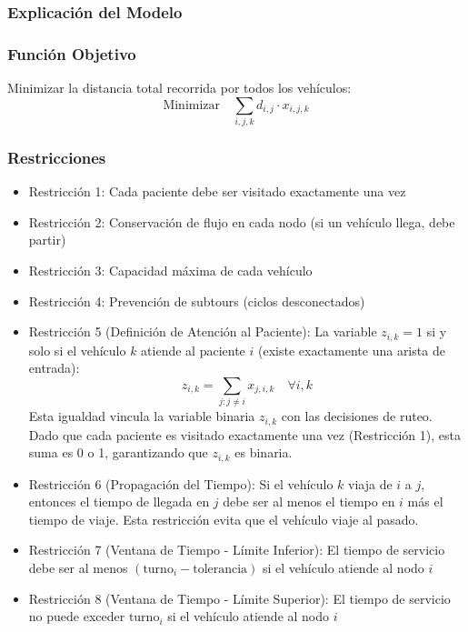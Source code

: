 \documentclass[12pt]{article}
\begin{document}
\subsubsection{Explicación del Modelo}

\subsubsection*{Función Objetivo}

Minimizar la distancia total recorrida por todos los vehículos:
\[
\text{Minimizar} \quad \sum_{i,j,k} d_{i,j} \cdot x_{i,j,k}
\]

\subsubsection*{Restricciones}

\begin{itemize}
    \item Restricción 1: Cada paciente debe ser visitado exactamente una vez
    
    \item Restricción 2: Conservación de flujo en cada nodo (si un vehículo llega, debe partir)
    
    \item Restricción 3: Capacidad máxima de cada vehículo
    
    \item Restricción 4: Prevención de subtours (ciclos desconectados)
    
    \item Restricción 5 (Definición de Atención al Paciente): La variable $z_{i,k} = 1$ si y solo si el vehículo $k$ atiende al paciente $i$ (existe exactamente una arista de entrada):
    \[
    z_{i,k} = \sum_{j: j \ne i} x_{j,i,k} \quad \forall i,k
    \]
    Esta igualdad vincula la variable binaria $z_{i,k}$ con las decisiones de ruteo. Dado que cada paciente es visitado exactamente una vez (Restricción 1), esta suma es 0 o 1, garantizando que $z_{i,k}$ es binaria.
    
    \item Restricción 6 (Propagación del Tiempo): Si el vehículo $k$ viaja de $i$ a $j$, entonces el tiempo de llegada en $j$ debe ser al menos el tiempo en $i$ más el tiempo de viaje. Esta restricción evita que el vehículo viaje al pasado.
    
    \item Restricción 7 (Ventana de Tiempo - Límite Inferior): El tiempo de servicio debe ser al menos $(\text{turno}_i - \text{tolerancia})$ si el vehículo atiende al nodo $i$
    
    \item Restricción 8 (Ventana de Tiempo - Límite Superior): El tiempo de servicio no puede exceder $\text{turno}_i$ si el vehículo atiende al nodo $i$
\end{itemize}
\end{document}
